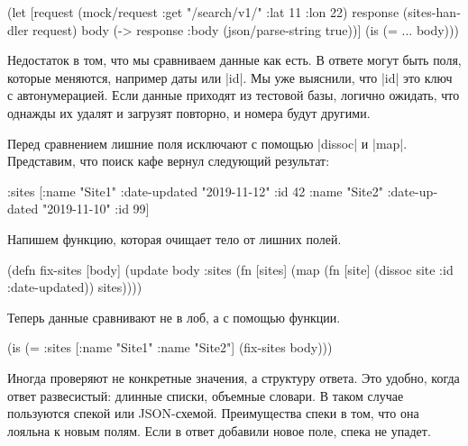 \begin{english}
  \begin{clojure}
(let [request (mock/request :get "/search/v1/" {:lat 11 :lon 22})
      response (sites-handler request)
      body (-> response :body (json/parse-string true))]
  (is (= {...} body)))
  \end{clojure}
\end{english}

Недостаток в том, что мы сравниваем данные как есть. В ответе могут быть поля,
которые меняются, например даты или \spverb|id|. Мы уже выяснили, что
\spverb|id| это ключ с автонумерацией. Если данные приходят из тестовой базы,
логично ожидать, что однажды их удалят и загрузят повторно, и номера будут
другими.

Перед сравнением лишние поля исключают с помощью \spverb|dissoc| и
\spverb|map|. Представим, что поиск кафе вернул следующий результат:

\begin{english}
  \begin{clojure}
{:sites [{:name "Site1" :date-updated "2019-11-12" :id 42}
         {:name "Site2" :date-updated "2019-11-10" :id 99}]}
  \end{clojure}
\end{english}

Напишем функцию, которая очищает тело от лишних полей.

\begin{english}
  \begin{clojure}
(defn fix-sites [body]
  (update body :sites
          (fn [sites]
            (map (fn [site]
                   (dissoc site :id :date-updated))
                 sites))))
  \end{clojure}
\end{english}

Теперь данные сравнивают не в лоб, а с помощью функции.

\begin{english}
  \begin{clojure}
(is (= {:sites [{:name "Site1"} {:name "Site2"}]}
       (fix-sites body)))
  \end{clojure}
\end{english}

Иногда проверяют не конкретные значения, а структуру ответа. Это удобно, когда
ответ развесистый: длинные списки, объемные словари. В таком случае пользуются
спекой или JSON-схемой. Преимущества спеки в том, что она лояльна к новым
полям. Если в ответ добавили новое поле, спека не упадет.

